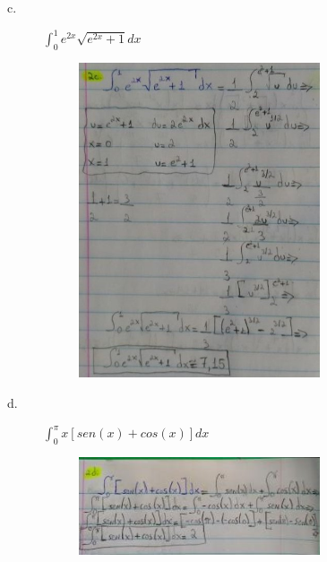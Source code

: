 \documentclass[a4paper, 12pt]{article}
\begin{document}
\begin{enumerate}
\begin{description}
  \item[c.] $ \int_0^{1}e^{2x}\sqrt{e^{2x}+1}dx $
  \begin{figure}[h!]
  \centering
  \includegraphics[width=0.7\textwidth]{resp2c}
  \end{figure} \newpage
  
  \item[d.] $ \int_0^{\pi}x[sen(x)+cos(x)]dx $
  \begin{figure}[h!]
  \centering
  \includegraphics[width=0.7\textwidth]{resp2d}
  \end{figure}  \newpage
  

\end{description}
\end{enumerate}
\end{document}
